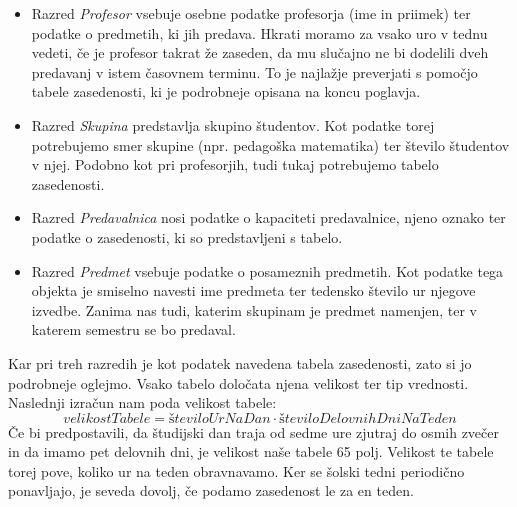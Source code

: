 \documentclass[a4paper,10pt]{article}
\begin{document}

\begin{itemize}  
   \item Razred \emph{Profesor} vsebuje osebne podatke profesorja (ime in priimek) ter
   podatke o predmetih, ki jih predava. Hkrati moramo za vsako uro v tednu vedeti, če
   je profesor takrat že zaseden, da mu slučajno ne bi dodelili dveh predavanj v istem
   časovnem terminu. To je najlažje preverjati s pomočjo tabele zasedenosti, ki je
   podrobneje opisana na koncu poglavja.

  \item  Razred \emph{Skupina} predstavlja skupino študentov. Kot podatke torej potrebujemo
   smer skupine (npr. pedagoška matematika) ter število študentov v njej. Podobno kot pri
   profesorjih, tudi tukaj potrebujemo tabelo zasedenosti.

   \item Razred \emph{Predavalnica} nosi podatke o kapaciteti predavalnice, njeno oznako
   ter podatke o zasedenosti, ki so predstavljeni s tabelo.

   \item Razred \emph{Predmet} vsebuje podatke o posameznih predmetih. Kot podatke tega
   objekta je smiselno navesti ime predmeta ter tedensko število ur njegove izvedbe.
   Zanima nas tudi, katerim skupinam je predmet namenjen, ter v katerem semestru se bo
   predaval.
\end{itemize}

\noindent Kar pri treh razredih je kot podatek navedena tabela zasedenosti, zato si jo podrobneje
oglejmo. Vsako tabelo določata njena velikost ter tip vrednosti. Naslednji izračun nam
poda velikost tabele:
               \[ velikostTabele = številoUrNaDan\cdot številoDelovnihDniNaTeden \] 
Če bi predpostavili, da študijski dan traja od sedme ure zjutraj do osmih zvečer in da
imamo pet delovnih dni, je velikost naše tabele 65 polj. Velikost te tabele torej pove,
koliko ur na teden obravnavamo. Ker se šolski tedni periodično ponavljajo, je seveda
dovolj, če podamo zasedenost le za en teden.
\end{document}

